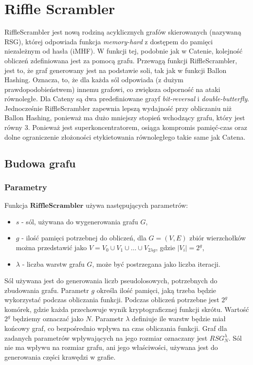 \chapter{Riffle Scrambler}
\thispagestyle{chapterBeginStyle}

RiffleScrambler \cite{rs} jest nową rodziną acyklicznych grafów skierowanych (nazywaną RSG), której odpowiada funkcja \textit{memory-hard} z dostępem do pamięci niezależnym od hasła (iMHF).
W funkcji tej, podobnie jak w Catenie, kolejność obliczeń zdefiniowana jest za pomocą grafu. 
Przewagą funkcji RiffleScrambler, jest to, że graf generowany jest na podstawie soli, tak jak w funkcji Ballon Hashing. Oznacza, to, że dla każda sól odpowiada (z dużym prawdopodobieństwem) innemu grafowi, co zwiększa odporność na ataki równoległe. Dla Cateny są dwa predefiniowane grayf \textit{bit-reversal} i \textit{double-butterfly}.
Jednocześnie RiffleScrambler zapewnia lepszą wydajność przy obliczaniu niż Ballon Hashing, ponieważ ma dużo mniejszy stopień wchodzący grafu, który jest równy 3.
Ponieważ jest superkoncentratorem, osiąga kompromis pamięć-czas oraz dolne ograniczenie złożoności etykietowania równoległego takie same jak Catena.

\section{Budowa grafu}

\subsection{Parametry} \label{2::params}
Funkcja $\mathbf{RiffleScrambler}$ używa następujących parametrów:
\begin{itemize}
	\item $s$ - sól, używana do wygenerowania grafu $G$,
	
	\item $g$ - \label{rs::g} ilość pamięci potrzebnej do obliczeń, dla $G = (V, E)$ zbiór wierzchołków można przedstawić jako $V = V_{0} \cup V_{1} \cup \dots \cup V_{2 \lambda g}$, gdzie $|V_{i}| = 2^{g}$,
	
	\item $\lambda$ - liczba warstw grafu $G$, może być postrzegana jako liczba iteracji.
\end{itemize}

Sól używana jest do generowania liczb pseudolosowych, potrzebnych do zbudowania grafu.
Parametr $g$ określa ilość pamięci, jaką trzeba będzie wykorzystać podczas obliczania funkcji. Podczas obliczeń potrzebne jest $2^{g}$ komórek, gdzie każda przechowuje wynik kryptograficznej funkcji skrótu. Wartość $2^g$ będziemy oznaczać jako $N$.
Parametr $\lambda$ definiuje ile warstw będzie miał końcowy graf, co bezpośrednio wpływa na czas obliczania funkcji.
Graf dla zadanych parametrów wpływających na jego rozmiar oznaczany jest $RSG_{N}^{\lambda}$. Sól nie ma wpływu na rozmiar grafu, ani jego właściwości, używana jest do generowania części krawędzi w grafie.


